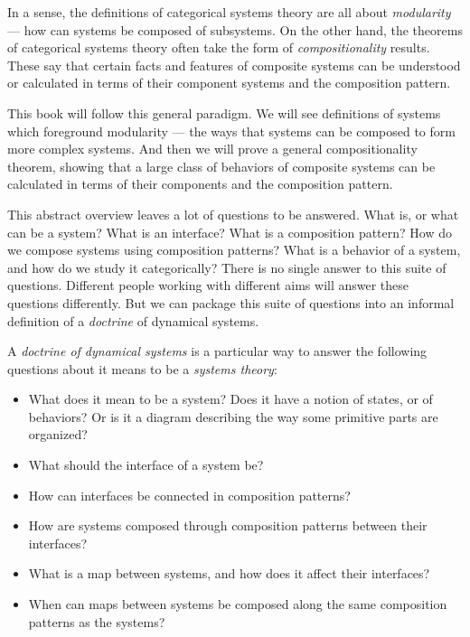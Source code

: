 \documentclass[DynamicalBook]{subfiles}
\begin{document}
In a sense, the definitions of categorical systems theory are all about \emph{modularity} --- how can systems be composed of subsystems. On the other hand, the theorems of categorical systems theory often take the form of \emph{compositionality} results. These say that certain facts and features of composite systems can be understood or calculated in terms of their component systems and the composition pattern.

This book will follow this general paradigm. We will see definitions of systems which foreground modularity --- the ways that systems can be composed to form more complex systems. And then we will prove a general compositionality theorem, showing that a large class of behaviors of composite systems can be calculated in terms of their components and the composition pattern.

This abstract overview leaves a lot of questions to be answered. What is, or what can be a system? What is an interface? What is a composition pattern? How do we compose systems using composition patterns? What is a behavior of a system, and how do we study it categorically? There is no single answer to this suite of questions. Different people working with different aims will answer these questions differently. But we can package this suite of questions into an informal definition of a \emph{doctrine} of dynamical systems.

\begin{informal}\label{informal:paradigm}
 A \emph{doctrine of dynamical systems} is a particular way to answer the following questions about it means to be a \emph{systems theory}:
 \begin{itemize}
   \item What does it mean to be a system? Does it have a notion of states, or of behaviors? Or is it a diagram describing the way some primitive parts are organized?
   \item What should the interface of a system be?
   \item How can interfaces be connected in composition patterns?
  \item How are systems composed through composition patterns between their interfaces?
  \item What is a map between systems, and how does it affect their interfaces?
  \item When can maps between systems be composed along the same composition patterns as the systems?
  \end{itemize}
  \end{informal}
\end{document}

